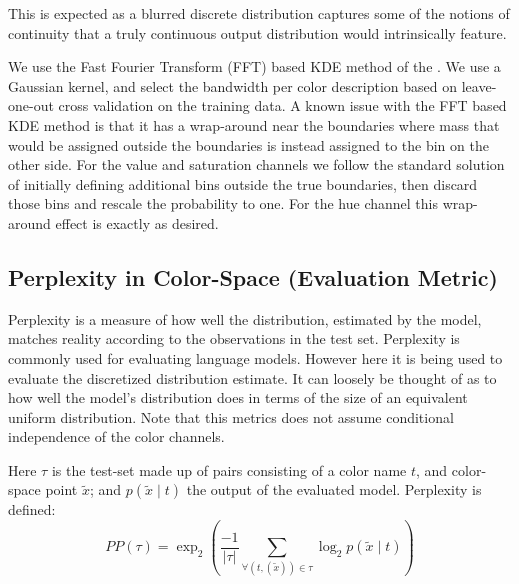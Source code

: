 \documentclass[11pt,a4paper]{article}
\newcommand{\textcite}{\citet}
\begin{document}
This is expected as a blurred discrete distribution captures some of the notions of continuity that a truly continuous output distribution would intrinsically feature.


We use the Fast Fourier Transform (FFT) based KDE method of the \textcite{silverman1982algorithm}.
We use a Gaussian kernel, and select the bandwidth per color description based on leave-one-out cross validation on the training data.
A known issue with the FFT based KDE method is that it has a wrap-around near the boundaries where mass that would be assigned outside the boundaries is instead assigned to the bin on the other side.
For the value and saturation channels we follow the standard solution of initially defining additional bins outside the true boundaries, then discard those bins and rescale the probability to one.
For the hue channel this wrap-around effect is exactly as desired.



\subsection{Perplexity in Color-Space (Evaluation Metric)}
Perplexity is a measure of how well the distribution, estimated by the model, matches reality according to the observations in the test set.
Perplexity is commonly used for evaluating language models. However here it is being used to evaluate the discretized distribution estimate.
It can loosely be thought of as to how well the model's distribution does in terms of the size of an equivalent uniform distribution.
Note that this metrics does not assume conditional independence of the color channels.

Here $\tau$ is the test-set made up of pairs consisting of a color name $t$, and color-space point $\tilde{x}$;
and  $p(\tilde{x}\mid t)$  the output of the evaluated model.
Perplexity is defined:
\begin{equation}
PP(\tau) = \exp_2{\left(
	\frac{-1}{|\tau|} 
	\sum_{
		\forall(t,(\tilde{x})) \in \tau}
	\log_2 p(\tilde{x}\mid t)\right)}
\end{equation}
\end{document}
